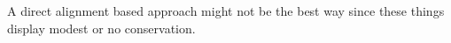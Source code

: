         
        A direct alignment based approach might not be the best way since these things display modest or no conservation. 
        

        

            
        
        
            
            
